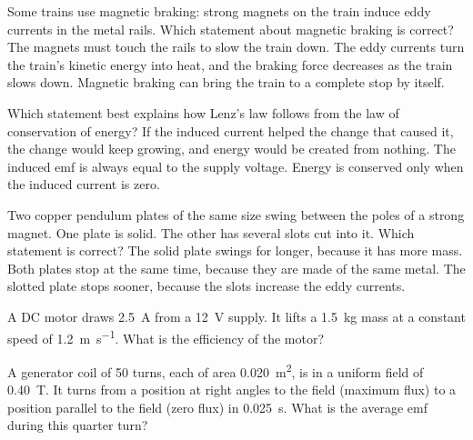 \begin{quizq}{}
Some trains use magnetic braking: strong magnets on the train induce eddy currents in the metal rails.
Which statement about magnetic braking is correct?
  {The magnets must touch the rails to slow the train down.}
  {The eddy currents turn the train's kinetic energy into heat, and the braking force decreases as the
   train slows down.}
  {Magnetic braking can bring the train to a complete stop by itself.}
\end{quizq}

\begin{quizq}{}
Which statement best explains how Lenz's law follows from the law of conservation of energy?
  {If the induced current helped the change that caused it, the change would keep growing, and energy
   would be created from nothing.}
  {The induced emf is always equal to the supply voltage.}
  {Energy is conserved only when the induced current is zero.}
\end{quizq}

\begin{quizq}{}
Two copper pendulum plates of the same size swing between the poles of a strong magnet. One plate is
solid. The other has several slots cut into it. Which statement is correct?
  {The solid plate swings for longer, because it has more mass.}
  {Both plates stop at the same time, because they are made of the same metal.}
  {The slotted plate stops sooner, because the slots increase the eddy currents.}
\end{quizq}

\begin{quizq}{}
A DC motor draws \qty{2.5}{A} from a \qty{12}{V} supply. It lifts a \qty{1.5}{kg} mass at a constant
speed of \qty{1.2}{m.s^{-1}}. What is the efficiency of the motor?
\end{quizq}

\begin{quizq}{}
A generator coil of 50 turns, each of area \qty{0.020}{m^2}, is in a uniform field of \qty{0.40}{T}. It
turns from a position at right angles to the field (maximum flux) to a position parallel to the field
(zero flux) in \qty{0.025}{s}. What is the average emf during this quarter turn?
\end{quizq}

